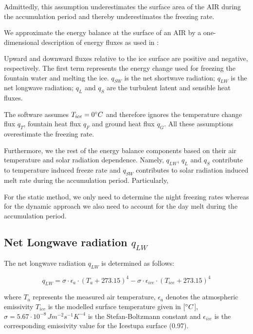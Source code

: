 \documentclass[tc, manuscript]{copernicus}
\begin{document}
Admittedly, this assumption underestimates the surface area of the AIR during the accumulation period and
thereby underestimates the freezing rate.

We approximate the energy balance at the surface of an AIR by a one-dimensional description of energy fluxes as
used in \cite{balasubramanianInfluenceMeteorologicalConditions2022}:


Upward and downward fluxes relative to the ice surface are positive and negative, respectively. The first term
represents the energy change used for freezing the fountain water and melting the ice. $q_{SW}$ is the net
shortwave radiation; $q_{LW}$ is the net longwave radiation; $q_{L}$ and $q_{S}$ are the turbulent latent and
sensible heat fluxes. 

The software assumes $T_{ice} = 0 ^{\circ} C$ and therefore ignores the temperature change flux $q_{T}$, fountain
heat flux $q_{F}$ and ground heat flux $q_{G}$. All these assumptions overestimate the freezing rate.

Furthermore, we the rest of the energy balance components based on their air temperature and solar
radiation dependence. Namely, $q_{LW}$, $q_{L}$ and $q_{S}$ contribute to temperature induced freeze rate and
$q_{SW}$ contributes to solar radiation induced melt rate during the accumulation period.  Particularly,

For the static method, we only need to determine the night freezing rates whereas for the dynamic approach we
also need to account for the day melt during the accumulation period.

\subsection{Net Longwave radiation \texorpdfstring{$q_{LW}$}{Lg}} \label{sec:LW}
The net longwave radiation $q_{LW}$ is determined as follows:

\begin{equation}
	q_{LW}= \sigma \cdot \epsilon_a \cdot {(T_a+ 273.15)}^4 -\sigma \cdot \epsilon_{ice} \cdot {(T_{ice}+ 273.15)}^4
	\label{eqn:LW}
\end{equation}

where $T_a$ represents the measured air temperature, $\epsilon_a$ denotes the atmospheric emissivity $T_{ice}$
is the modelled surface temperature given in [$^{\circ} C$], $\sigma=5.67\cdot10^{-8}\,Jm^{-2}s^{-1}K^{-4}$ is
the Stefan-Boltzmann constant and $\epsilon_{ice}$ is the corresponding emissivity value for the Icestupa
surface (0.97).
\end{document}
